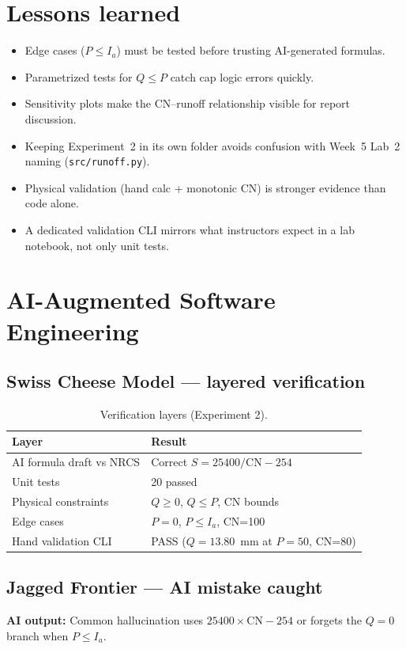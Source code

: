 \documentclass[11pt,a4paper]{article}
\begin{document}
\section{Lessons learned}
\begin{itemize}[noitemsep]
  \item Edge cases ($P \le I_a$) must be tested before trusting AI-generated formulas.
  \item Parametrized tests for $Q \le P$ catch cap logic errors quickly.
  \item Sensitivity plots make the $\mathrm{CN}$--runoff relationship visible for report discussion.
  \item Keeping Experiment~2 in its own folder avoids confusion with Week~5 Lab~2 naming (\texttt{src/runoff.py}).
  \item Physical validation (hand calc + monotonic $\mathrm{CN}$) is stronger evidence than code alone.
  \item A dedicated validation CLI mirrors what instructors expect in a lab notebook, not only unit tests.
\end{itemize}

\section{AI-Augmented Software Engineering}
\label{sec:ai-eng}

\subsection{Swiss Cheese Model --- layered verification}
\begin{table}[htbp]
  \centering
  \caption{Verification layers (Experiment 2).}
  \label{tab:swiss2}
  \begin{tabular}{@{}ll@{}}
    \toprule
    Layer & Result \\
    \midrule
    AI formula draft vs NRCS & Correct $S=25400/\mathrm{CN}-254$ \\
    Unit tests & 20 passed \\
    Physical constraints & $Q\ge 0$, $Q\le P$, CN bounds \\
    Edge cases & $P=0$, $P\le I_a$, CN=100 \\
    Hand validation CLI & PASS ($Q=13.80$~mm at $P=50$, CN=80) \\
    \bottomrule
  \end{tabular}
\end{table}

\subsection{Jagged Frontier --- AI mistake caught}
\textbf{AI output:} Common hallucination uses $25400\times\mathrm{CN}-254$ or forgets the $Q=0$ branch when $P\le I_a$.
\end{document}
